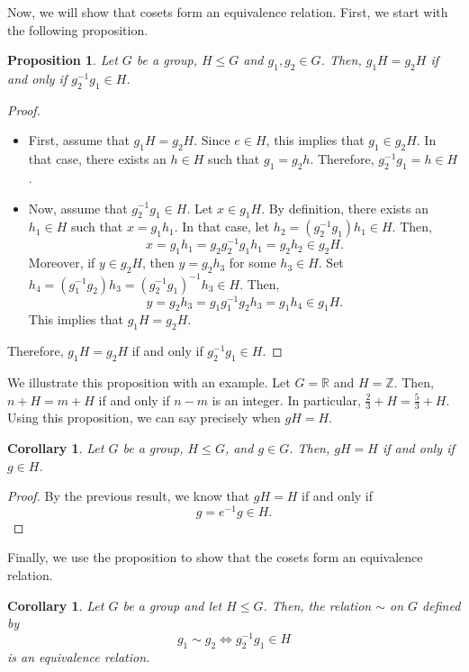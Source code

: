 \documentclass[a4paper, openany]{memoir}
\theoremstyle{definition}
\theoremstyle{plain}
\newtheorem{proposition}[definition]{Proposition}
\newtheorem{corollary}[definition]{Corollary}
\begin{document}
Now, we will show that cosets form an equivalence relation. First, we start with the following proposition.
\begin{proposition}
Let $G$ be a group, $H \leqslant G$ and $g_1, g_2 \in G$. Then, $g_1H = g_2H$ if and only if $g_2^{-1} g_1 \in H$.
\end{proposition}
\begin{proof}
\hspace*{0pt}
\begin{itemize}
    \item First, assume that $g_1H = g_2H$. Since $e \in H$, this implies that $g_1 \in g_2H$. In that case, there exists an $h \in H$ such that $g_1 = g_2h$. Therefore, $g_2^{-1} g_1 = h \in H$.
    \item Now, assume that $g_2^{-1} g_1 \in H$. Let $x \in g_1H$. By definition, there exists an $h_1 \in H$ such that $x = g_1h_1$. In that case, let $h_2 = (g_2^{-1}g_1)h_1 \in H$. Then,
    \[x = g_1h_1 = g_2g_2^{-1}g_1h_1 = g_2h_2 \in g_2H.\]
    Moreover, if $y \in g_2H$, then $y = g_2h_3$ for some $h_3 \in H$. Set $h_4 = (g_1^{-1} g_2)h_3 = (g_2^{-1}g_1)^{-1} h_3 \in H$. Then,
    \[y = g_2h_3 = g_1g_1^{-1}g_2h_3 = g_1h_4 \in g_1H.\]
    This implies that $g_1H = g_2H$.
\end{itemize}
Therefore, $g_1H = g_2H$ if and only if $g_2^{-1} g_1 \in H$.
\end{proof}
\noindent We illustrate this proposition with an example. Let $G = \mathbb{R}$ and $H = \mathbb{Z}$. Then, $n + H = m + H$ if and only if $n - m$ is an integer. In particular, $\frac{2}{3} + H = \frac{5}{3} + H$. Using this proposition, we can say precisely when $gH = H$.
\begin{corollary}
Let $G$ be a group, $H \leqslant G$, and $g \in G$. Then, $gH = H$ if and only if $g \in H$.
\end{corollary}
\begin{proof}
By the previous result, we know that $gH = H$ if and only if 
\[g = e^{-1}g \in H.\]
\end{proof}
\noindent Finally, we use the proposition to show that the cosets form an equivalence relation.
\begin{corollary}
Let $G$ be a group and let $H \leqslant G$. Then, the relation $\sim$ on $G$ defined by
\[g_1 \sim g_2 \iff g_2^{-1}g_1 \in H\]
is an equivalence relation.
\end{corollary}
\end{document}
